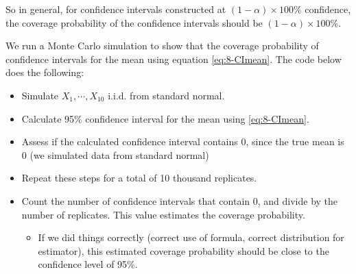 \documentclass[
]{book}
\providecommand{\tightlist}{%
  \setlength{\itemsep}{0pt}\setlength{\parskip}{0pt}}
\begin{document}
So in general, for confidence intervals constructed at \((1-\alpha) \times 100\%\) confidence, the coverage probability of the confidence intervals should be \((1-\alpha) \times 100\%\).

We run a Monte Carlo simulation to show that the coverage probability of confidence intervals for the mean using equation \eqref{eq:8-CImean}. The code below does the following:

\begin{itemize}
\tightlist
\item
  Simulate \(X_1, \cdots, X_{10}\) i.i.d. from standard normal.
\item
  Calculate 95\% confidence interval for the mean using \eqref{eq:8-CImean}.
\item
  Assess if the calculated confidence interval contains 0, since the true mean is 0 (we simulated data from standard normal)
\item
  Repeat these steps for a total of 10 thousand replicates.
\item
  Count the number of confidence intervals that contain 0, and divide by the number of replicates. This value estimates the coverage probability.

  \begin{itemize}
  \tightlist
  \item
    If we did things correctly (correct use of formula, correct distribution for estimator), this estimated coverage probability should be close to the confidence level of 95\%.
  \end{itemize}
\end{itemize}
\end{document}
